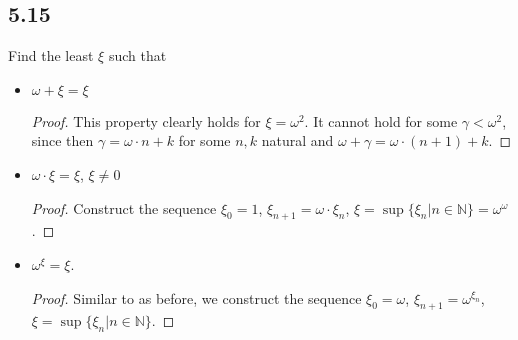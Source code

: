 \subsection*{5.15}
    Find the least $\xi$ such that

    \begin{itemize}
        \item $\omega + \xi = \xi$
        \begin{proof}
            This property clearly holds for $\xi = \omega^2$. It cannot hold for some $\gamma < \omega^2$, since then $\gamma = \omega \cdot n+k$ for some $n,k$ natural and $\omega + \gamma = \omega \cdot (n+1)+k$.
        \end{proof}

        \item $\omega \cdot \xi = \xi$, $\xi \neq 0$
        \begin{proof}
            Construct the sequence $\xi_0 = 1$, $\xi_{n+1} = \omega \cdot \xi_n$, $\xi = \sup\{\xi_n | n \in \mathbb{N}\} = \omega^\omega$.
        \end{proof}

        \item $\omega ^\xi = \xi$.

        \begin{proof}
            Similar to as before, we construct the sequence $\xi_0 = \omega$, $\xi_{n+1} = \omega^{\xi_n}$, $\xi = \sup\{\xi_n | n \in \mathbb{N}\}$.
        \end{proof}

    \end{itemize}
    
